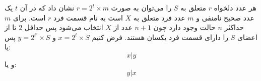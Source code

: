 \p
هر عدد دلخواه
$r$
متعلق به
$S$
را می‌توان به صورت
$r = 2^t \times m$
نشان داد که در آن
$t$
یک عدد صحیح نامنفی و
$m$
عدد فرد متعلق به
$X$
است به نام قسمت فرد
$r$
است. برای
$m$
حداکثر
$n$
حالت وجود دارد چون
$n + 1$
عدد از
$X$
انتخاب می‌شود پس حداقل
$2$
تا از اعضای
$S$
را دارای قسمت فرد یکسان هستند. فرض کنیم
$x = 2^t \times S$
و
$y = 2^{t'} \times S$
پس یا:
$$x|y$$
و یا:
$$y|x$$